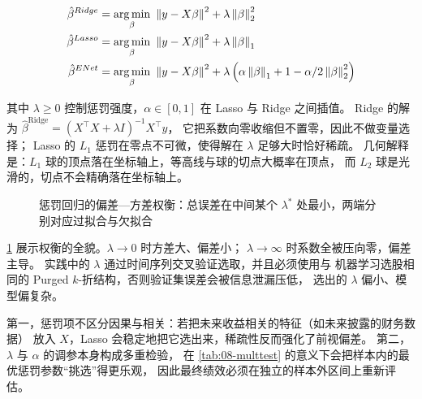 \begin{align}
  \hat{\beta}^{Ridge} &= \operatorname*{arg\,min}_{\beta}\ \left\lVert y - X\beta \right\rVert^{2} + \lambda\left\lVert \beta \right\rVert_{2}^{2}
    \label{eq:08-ridge} \\
  \hat{\beta}^{Lasso} &= \operatorname*{arg\,min}_{\beta}\ \left\lVert y - X\beta \right\rVert^{2} + \lambda\left\lVert \beta \right\rVert_{1}
    \label{eq:08-lasso} \\
  \hat{\beta}^{ENet} &= \operatorname*{arg\,min}_{\beta}\ \left\lVert y - X\beta \right\rVert^{2}
    + \lambda\left(\alpha\left\lVert \beta \right\rVert_{1} + 1-\alpha/2\left\lVert \beta \right\rVert_{2}^{2}\right)
    \label{eq:08-enet}
\end{align}

其中 $\lambda \ge 0$ 控制惩罚强度，$\alpha \in [0,1]$ 在 Lasso 与 Ridge 之间插值。
Ridge 的解为 $\hat{\beta}^{\text{Ridge}} = (X^{\top}X + \lambda I)^{-1}X^{\top}y$，
它把系数向零收缩但不置零，因此不做变量选择；
Lasso 的 $L_1$ 惩罚在零点不可微，使得解在 $\lambda$ 足够大时恰好稀疏。
几何解释是：$L_1$ 球的顶点落在坐标轴上，等高线与球的切点大概率在顶点，
而 $L_2$ 球是光滑的，切点不会精确落在坐标轴上。

\begin{figure}[htbp]
\centering
{}
\caption{惩罚回归的偏差—方差权衡：总误差在中间某个 $\lambda^{*}$ 处最小，两端分别对应过拟合与欠拟合}\label{fig:08-biasvar}
\end{figure}

\cref{fig:08-biasvar} 展示权衡的全貌。$\lambda \to 0$ 时方差大、偏差小；
$\lambda \to \infty$ 时系数全被压向零，偏差主导。
实践中的 $\lambda$ 通过时间序列交叉验证选取，并且必须使用与
机器学习选股相同的 Purged $k$-折结构，否则验证集误差会被信息泄漏压低，
选出的 $\lambda$ 偏小、模型偏复杂。

\begin{warningbox}[惩罚回归在因子研究中的两个陷阱]
第一，惩罚项不区分因果与相关：若把未来收益相关的特征（如未来披露的财务数据）
放入 $X$，Lasso 会稳定地把它选出来，稀疏性反而强化了前视偏差。
第二，$\lambda$ 与 $\alpha$ 的调参本身构成多重检验，
在 \cref{tab:08-multtest} 的意义下会把样本内的最优惩罚参数“挑选”得更乐观，
因此最终绩效必须在独立的样本外区间上重新评估。
\end{warningbox}

